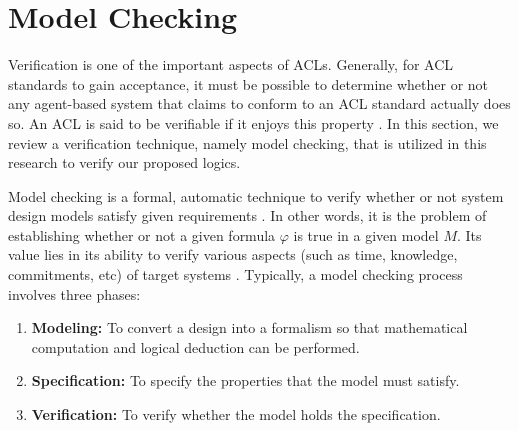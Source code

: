 \section{Model Checking} \label{sec:Model-Checking-cha2}

Verification is one of the important aspects of ACLs. Generally, for ACL standards to gain acceptance, it must be possible to determine whether or not any agent-based system that claims to conform to an ACL standard actually does so. An ACL is said to be verifiable if it enjoys this property \cite{Wooldridge1998,Wooldridge2000}. In this section, we review a verification technique, namely model checking, that is utilized in this research to verify our proposed logics.


Model checking is a formal, automatic technique to verify whether
or not system design models satisfy given requirements \cite{Bordini2006,Clarke1999}. In other words, it is the problem of establishing whether or not a given formula $\varphi$ is true
in a given model $M$. Its value lies in its ability to verify various aspects (such as time, knowledge, commitments, etc) of target systems \cite{Konur2013}. Typically, a model checking process involves three phases:

\begin{enumerate}
\item \textbf{Modeling:} To convert a design into a formalism so that mathematical computation and logical deduction can be performed.
\item \textbf{Specification:} To specify the properties that the model must satisfy.
\item \textbf{Verification:} To verify whether the model holds the specification.
\end{enumerate}


